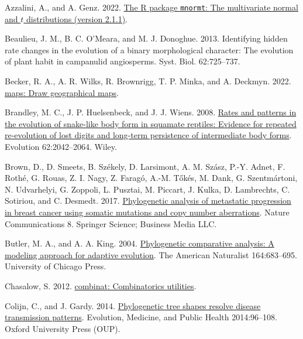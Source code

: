 \documentclass[fleqn,10pt,lineno]{wlpeerj} %
\newlength{\cslhangindent}
\newenvironment{CSLReferences}[2] %
 {\begin{list}{}{%
  \setlength{\itemindent}{0pt}
  \setlength{\leftmargin}{0pt}
  \setlength{\parsep}{0pt}
  \ifodd #1
   \setlength{\leftmargin}{\cslhangindent}
   \setlength{\itemindent}{-1\cslhangindent}
  \fi
  \setlength{\itemsep}{#2\baselineskip}}}
 {\end{list}}
\begin{document}
\label{refs}
\begin{CSLReferences}{1}{0}
Azzalini, A., and A. Genz. 2022. \href{http://azzalini.stat.unipd.it/SW/Pkg-mnormt/}{The {R} package \texttt{mnormt}: The multivariate normal and \(t\) distributions (version 2.1.1)}.

Beaulieu, J. M., B. C. O'Meara, and M. J. Donoghue. 2013. Identifying hidden rate changes in the evolution of a binary morphological character: The evolution of plant habit in campanulid angiosperms. Syst. Biol. 62:725--737.

Becker, R. A., A. R. Wilks, R. Brownrigg, T. P. Minka, and A. Deckmyn. 2022. \href{https://CRAN.R-project.org/package=maps}{{maps}: Draw geographical maps}.

Brandley, M. C., J. P. Huelsenbeck, and J. J. Wiens. 2008. \href{https://doi.org/10.1111/j.1558-5646.2008.00430.x}{Rates and patterns in the evolution of snake-like body form in squamate reptiles: Evidence for repeated re-evolution of lost digits and long-term persistence of intermediate body forms}. Evolution 62:2042--2064. Wiley.

Brown, D., D. Smeets, B. Székely, D. Larsimont, A. M. Szász, P.-Y. Adnet, F. Rothé, G. Rouas, Z. I. Nagy, Z. Faragó, A.-M. Tőkés, M. Dank, G. Szentmártoni, N. Udvarhelyi, G. Zoppoli, L. Pusztai, M. Piccart, J. Kulka, D. Lambrechts, C. Sotiriou, and C. Desmedt. 2017. \href{https://doi.org/10.1038/ncomms14944}{Phylogenetic analysis of metastatic progression in breast cancer using somatic mutations and copy number aberrations}. Nature Communications 8. Springer Science; Business Media LLC.

Butler, M. A., and A. A. King. 2004. \href{https://doi.org/10.1086/426002}{Phylogenetic comparative analysis: A modeling approach for adaptive evolution}. The American Naturalist 164:683--695. University of Chicago Press.

Chasalow, S. 2012. \href{https://CRAN.R-project.org/package=combinat}{{combinat}: Combinatorics utilities}.

Colijn, C., and J. Gardy. 2014. \href{https://doi.org/10.1093/emph/eou018}{Phylogenetic tree shapes resolve disease transmission patterns}. Evolution, Medicine, and Public Health 2014:96--108. Oxford University Press (OUP).


\end{CSLReferences}
\end{document}
